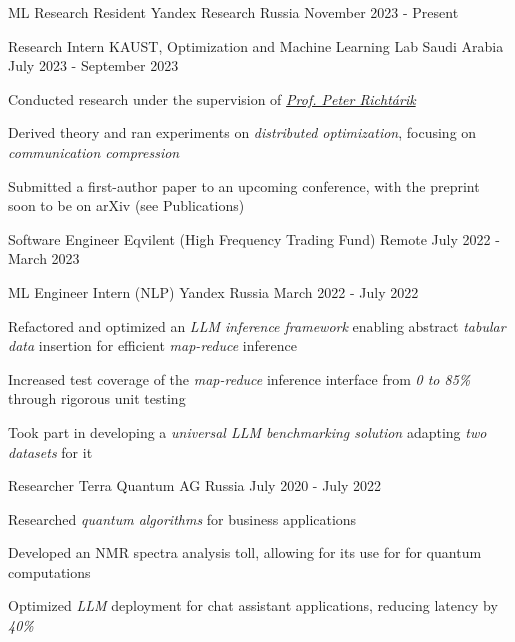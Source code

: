 
\begin{cventries}
  \cventry
    {ML Research Resident}
    {Yandex Research}
    {Russia}
    {November 2023 - Present}
    {}

  \cventry
    {Research Intern}
    {KAUST, Optimization and Machine Learning Lab}
    {Saudi Arabia}
    {July 2023 - September 2023}
    {
      \begin{cvitems}
        \item {Conducted research under the supervision of  \href{https://richtarik.org/}{\textit{Prof. Peter Richtárik}}}
        \item {Derived theory and ran experiments on \textit{distributed optimization}, focusing on \textit{communication compression}}
        \item {Submitted a first-author paper to an upcoming conference, with the preprint soon to be on arXiv (see Publications)}
      \end{cvitems}
    }

  \cventry
    {Software Engineer}
    {Eqvilent (High Frequency Trading Fund)}
    {Remote}
    {July 2022 - March 2023}
    {}

  \cventry
    {ML Engineer Intern (NLP)}
    {Yandex}
    {Russia}
    {March 2022 - July 2022}
    {
      \begin{cvitems} %
        \item {Refactored and optimized an \textit{LLM inference framework} enabling abstract \textit{tabular data} insertion for efficient \textit{map-reduce} inference}
        \item {Increased test coverage of the \textit{map-reduce} inference interface from \textit{0 to 85\%} through rigorous unit testing}
        \item {Took part in developing a \textit{universal LLM benchmarking solution} adapting \textit{two datasets} for it}
      \end{cvitems}
    }
    
  \cventry
    {Researcher} %
    {Terra Quantum AG} %
    {Russia} %
    {July 2020 - July 2022} %
    {
      \begin{cvitems} %
        \item { Researched \textit{quantum algorithms} for business applications }
        \item { Developed an {NMR spectra} analysis toll, allowing for its use for  for quantum computations }
        \item { Optimized \textit{LLM} deployment for chat assistant applications, reducing latency by \textit{40\%} }
      \end{cvitems}
    }
    
\end{cventries}
